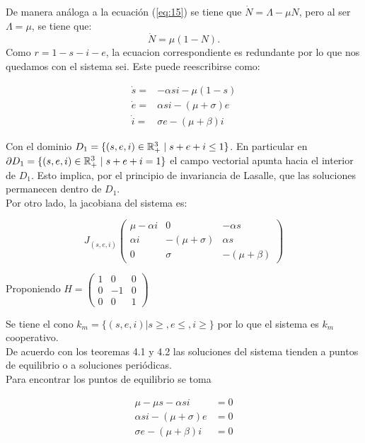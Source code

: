 \documentclass[10pt,oneside]{article}
\theoremstyle{definition}
\begin{document}
\begin{multicols}{2}
    De manera análoga a la ecuación (\ref{eq:15}) se tiene que $\dot N=\Lambda-\mu N$, pero al ser $\Lambda=\mu$, se tiene que: $$\dot N=\mu(1-N).$$ Como $r=1-s-i-e$, la ecuacion correspondiente es redundante por lo que nos quedamos con el sistema sei. Este puede reescribirse como:

    $$\begin{array}{rl}
         \dot s=& -\alpha si-\mu(1-s)  \\
         \dot e =& \alpha si -(\mu+\sigma)e  \\
         \dot i=&\sigma e -(\mu+\beta)i   
    \end{array}$$

    Con el dominio $D_1=\{(s,e,i) \in \mathbb{R}^3_+\hspace{0.1cm}|\hspace{0.1cm}s+e+i\leq1\}$. En particular en $\partial D_1=\{(s,e,i) \in \mathbb{R}^3_+\hspace{0.1cm}|\hspace{0.1cm}s+e+i=1\}$ el campo vectorial apunta hacia el interior de $D_1$. Esto implica, por el principio de invariancia de Lasalle, que las soluciones permanecen dentro de $D_1.$\\ \newline Por otro lado, la jacobiana del sistema es:

    $$J_{(s,e,i)}\left(\begin{array}{ccc}
        \mu-\alpha i &0 &-\alpha s \\
        \alpha i & -(\mu+\sigma)&\alpha s \\
         0&\sigma &-(\mu+\beta)
    \end{array}\right)$$

    Proponiendo $H=\displaystyle{\left(\begin{array}{ccc}
         1& 0 &0\\
         0& -1 &0\\
         0& 0 & 1
    \end{array}\right)}$
    
    Se tiene el cono $k_m=\{(s,e,i)|s\geq, e\leq, i\geq \}$ por lo que el sistema es $k_m$ cooperativo. \\\newline De acuerdo con los teoremas 4.1 y 4.2 las soluciones del sistema tienden a puntos de equilibrio o a soluciones periódicas. \\ Para encontrar los puntos de equilibrio se toma 

    $$\begin{array}{rl}
        \mu -\mu s-\alpha si &=0  \\
         \alpha si -(\mu+\sigma)e&=0  \\
        \sigma e -(\mu+\beta)i &=0 
    \end{array}$$


\end{multicols}
\end{document}
